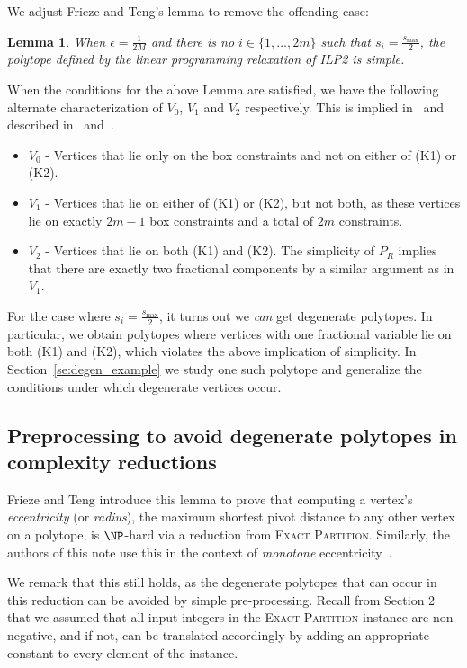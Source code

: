 \documentclass[3p, twocolumn]{elsarticle}
\newtheorem{lemma}[theorem]{Lemma}
\begin{document}
We adjust Frieze and Teng's lemma to remove the offending case:

\begin{lemma}\label{new}
    When \(\epsilon = \frac{1}{2M}\) and there is no $i \in \{1,\ldots,2m\}$ such that $s_i = \frac{s_{\max}}{2}$, the polytope defined by the linear programming relaxation of ILP2 is simple.
\end{lemma}


When the conditions for the above Lemma are satisfied, we have the following alternate characterization of $V_0$, $V_1$ and $V_2$ respectively. This is implied in~\cite{FT94} and described in~\cite{KN25} and~\cite{NS26}.

\begin{itemize}
    \item $V_0$ - Vertices that lie only on the box constraints and not on either of (K1) or (K2).
    \item $V_1$ - Vertices that lie on either of (K1) or (K2), but not both, as these vertices lie on exactly $2m-1$ box constraints and a total of $2m$ constraints. 
    \item $V_2$ - Vertices that lie on both (K1) and (K2). The simplicity of $P_R$ implies that there are exactly two fractional components by a similar argument as in $V_1$. 
\end{itemize}

For the case where $s_i = \frac{s_{\max}}{2}$, it turns out we \emph{can} get degenerate polytopes. In particular, we obtain polytopes where vertices with one fractional variable lie on both (K1) and (K2), which violates the above implication of simplicity. In Section~\ref{se:degen_example} we study one such polytope and generalize the conditions under which degenerate vertices occur.  

\subsection{Preprocessing to avoid degenerate polytopes in complexity reductions}

Frieze and Teng introduce this lemma to prove that computing a vertex's \emph{eccentricity} (or \emph{radius}), the maximum shortest pivot distance to any other vertex on a polytope, is $\NP$-hard via a reduction from \textsc{Exact Partition}.  Similarly, the authors of this note use this in the context of \emph{monotone} eccentricity~\cite{NS26}. 

We remark that this still holds, as the degenerate polytopes that can occur in this reduction can be avoided by simple pre-processing.
Recall from Section 2 that we assumed that all input integers in the \textsc{Exact Partition} instance are non-negative, and if not, can be translated accordingly by adding an appropriate constant to every element of the instance. 
\end{document}
